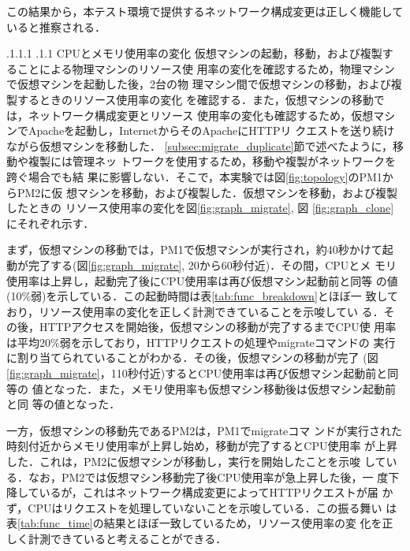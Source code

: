 \documentclass[a4paper, twocolumn]{jarticle}
\makeatletter
\def\subsection{\@startsection{subsection}{1}{\z@}%
 {.1\Cvs \@plus.1\Cdp \@minus.1\Cdp}%
 {.1\Cvs \@plus.1\Cdp}%
 {\normalfont\normalsize\bfseries}}
\makeatother
\begin{document}
この結果から，本テスト環境で提供するネットワーク構成変更は正しく機能していると推察される．

\subsection{CPUとメモリ使用率の変化}
仮想マシンの起動，移動，および複製することによる物理マシンのリソース使
用率の変化を確認するため，物理マシンで仮想マシンを起動した後，2台の物
理マシン間で仮想マシンの移動，および複製するときのリソース使用率の変化
を確認する．また，仮想マシンの移動では，ネットワーク構成変更とリソース
使用率の変化も確認するため，仮想マシンでApacheを起動し，InternetからそのApacheにHTTPリ
クエストを送り続けながら仮想マシンを移動した．
\ref{subsec:migrate_duplicate}節で述べたように，移動や複製には管理ネッ
トワークを使用するため，移動や複製がネットワークを跨ぐ場合でも結
果に影響しない．そこで，本実験では図\ref{fig:topology}のPM1からPM2に仮
想マシンを移動，および複製した．仮想マシンを移動，および複製したときの
リソース使用率の変化を図\ref{fig:graph_migrate}, 図
\ref{fig:graph_clone}にそれぞれ示す．

まず，仮想マシンの移動では，PM1で仮想マシンが実行され，約40秒かけて起
動が完了する(図\ref{fig:graph_migrate}, 20から60秒付近)．その間，CPUとメ
モリ使用率は上昇し，起動完了後にCPU使用率は再び仮想マシン起動前と同等
の値(10\%弱)を示している．この起動時間は表\ref{tab:func_breakdown}とほぼ一
致しており，リソース使用率の変化を正しく計測できていることを示唆してい
る．その後，HTTPアクセスを開始後，仮想マシンの移動が完了するまでCPU使
用率は平均20\%弱を示しており，HTTPリクエストの処理やmigrateコマンドの
実行に割り当てられていることがわかる．その後，仮想マシンの移動が完了
(図\ref{fig:graph_migrate}，110秒付近)するとCPU使用率は再び仮想マシン起動前と同等の
値となった．また，メモリ使用率も仮想マシン移動後は仮想マシン起動前と同
等の値となった．

一方，仮想マシンの移動先であるPM2は，PM1でmigrateコマ
ンドが実行された時刻付近からメモリ使用率が上昇し始め，移動が完了するとCPU使用率
が上昇した．これは，PM2に仮想マシンが移動し，実行を開始したことを示唆
している．なお，PM2では仮想マシン移動完了後CPU使用率が急上昇した後，一
度下降しているが，これはネットワーク構成変更によってHTTPリクエストが届
かず，CPUはリクエストを処理していないことを示唆している．この振る舞い
は表\ref{tab:func_time}の結果とほぼ一致しているため，リソース使用率の変
化を正しく計測できていると考えることができる．
\end{document}
